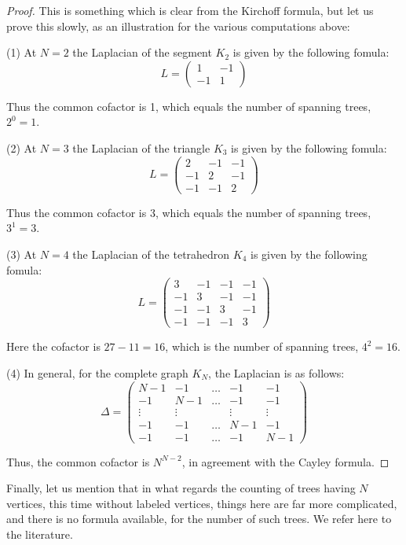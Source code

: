 \documentclass[12pt]{amsbook}
\begin{document}
\begin{proof}
This is something which is clear from the Kirchoff formula, but let us prove this slowly, as an illustration for the various computations above:

\medskip

(1) At $N=2$ the Laplacian of the segment $K_2$ is given by the following fomula:
$$L=\begin{pmatrix}1&-1\\-1&1\end{pmatrix}$$

Thus the common cofactor is 1, which equals the number of spanning trees, $2^0=1$.

\medskip

(2) At $N=3$ the Laplacian of the triangle $K_3$ is given by the following fomula:
$$L=\begin{pmatrix}
2&-1&-1\\
-1&2&-1\\
-1&-1&2
\end{pmatrix}$$

Thus the common cofactor is 3, which equals the number of spanning trees, $3^1=3$.

\medskip

(3) At $N=4$ the Laplacian of the tetrahedron $K_4$ is given by the following fomula:
$$L=\begin{pmatrix}
3&-1&-1&-1\\
-1&3&-1&-1\\
-1&-1&3&-1\\
-1&-1&-1&3
\end{pmatrix}$$

Here the cofactor is $27-11=16$, which is the number of spanning trees, $4^2=16$.

\medskip

(4) In general, for the complete graph $K_N$, the Laplacian is as follows:
$$\Delta=\begin{pmatrix}
N-1&-1&\ldots&-1&-1\\
-1&N-1&\ldots&-1&-1\\
\vdots&\vdots&&\vdots&\vdots\\
-1&-1&\ldots&N-1&-1\\
-1&-1&\ldots&-1&N-1
\end{pmatrix}$$

Thus, the common cofactor is $N^{N-2}$, in agreement with the Cayley formula.
\end{proof}

Finally, let us mention that in what regards the counting of trees having $N$ vertices, this time without labeled vertices, things here are far more complicated, and there is no formula available, for the number of such trees. We refer here to the literature.
\end{document}
